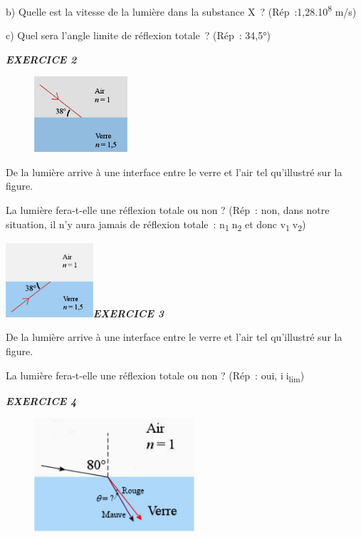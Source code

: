 b) Quelle est la vitesse de la lumière dans la substance X~?
(Rép~:1,28.10\textsuperscript{8} m/s)

c) Quel sera l'angle limite de réflexion totale~? (Rép~: 34,5°)

\emph{\textbf{EXERCICE 2}}

\begin{figure}
\centering
\includegraphics[width=3.475cm,height=2.801cm]{Pictures/10000001000003C60000030BB07F4672F43BCB0A.png}
\caption{}
\end{figure}

De la lumière arrive à une interface entre le verre et l'air tel
qu'illustré sur la figure.

La lumière fera-t-elle une réflexion totale ou non\textbf{ }? (Rép~:
non, dans notre situation, il n'y aura jamais de réflexion totale~:
n\textsubscript{1}n\textsubscript{2} et donc
v\textsubscript{1}v\textsubscript{2})

\includegraphics[width=3.246cm,height=2.75cm]{Pictures/100000010000031A000002A1271E381BD22001F0.png}\emph{\textbf{EXERCICE
3}}

De la lumière arrive à une interface entre le verre et l'air tel
qu'illustré sur la figure.

La lumière fera-t-elle une réflexion totale ou non\textbf{ }? (Rép~:
oui, ii\textsubscript{lim})

\emph{\textbf{EXERCICE 4}}

\begin{figure}
\centering
\includegraphics[width=5.944cm,height=4.209cm]{Pictures/10000001000003DA000002BA1D52E5C4A7536E3C.png}
\caption{}
\end{figure}


